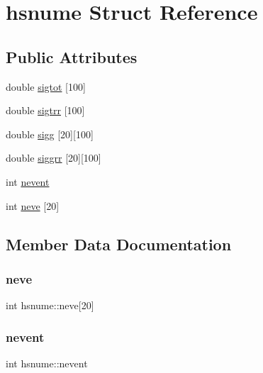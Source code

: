 \hypertarget{structhsnume}{}\section{hsnume Struct Reference}
\label{structhsnume}
\subsection*{Public Attributes}
\begin{DoxyCompactItemize}
\item 
double \hyperlink{structhsnume_ad83b273fb9a02cf1faf3031d209e0ce1}{sigtot} \mbox{[}100\mbox{]}
\item 
double \hyperlink{structhsnume_a76bc97de817d06e5b6ee2f0bc37ad7dd}{sigtrr} \mbox{[}100\mbox{]}
\item 
double \hyperlink{structhsnume_a2ba6a7dcef66b03f51326be9d34d929d}{sigg} \mbox{[}20\mbox{]}\mbox{[}100\mbox{]}
\item 
double \hyperlink{structhsnume_af0f418356c58dc2308acf139113abe6b}{siggrr} \mbox{[}20\mbox{]}\mbox{[}100\mbox{]}
\item 
int \hyperlink{structhsnume_a77196ea7fadc82a721b7a6ed949cf7aa}{nevent}
\item 
int \hyperlink{structhsnume_a3440b3b417e4b5b2cc4a59ab42eb73eb}{neve} \mbox{[}20\mbox{]}
\end{DoxyCompactItemize}


\subsection{Member Data Documentation}
\mbox{\label{structhsnume_a3440b3b417e4b5b2cc4a59ab42eb73eb}} 
\subsubsection{\texorpdfstring{neve}{neve}}
{\footnotesize\ttfamily int hsnume\+::neve\mbox{[}20\mbox{]}}

\mbox{\label{structhsnume_a77196ea7fadc82a721b7a6ed949cf7aa}} 
\subsubsection{\texorpdfstring{nevent}{nevent}}
{\footnotesize\ttfamily int hsnume\+::nevent}

